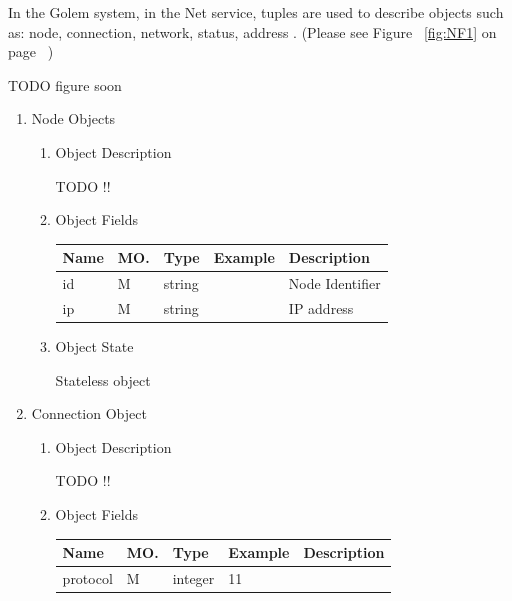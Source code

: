 In the Golem system, in the Net service, tuples are used to describe objects such as:
node, connection, network, status, address . (Please see Figure ~\ref{fig:NF1} on page ~\pageref{fig:NF1})

TODO figure soon

\begin{enumerate}

\item Node Objects

\begin{enumerate}

\item Object Description

TODO !!

\item Object Fields

\begin{center}
\begin{tabular}{|p{3cm}|l|p{3cm}|p{3cm}|p{4cm}|} 
\hline
\rowcolor{lightgray}	Name	& MO.	& Type	& Example & 	Description \\
\hline

id 	& M & string & 		& Node Identifier \\
\hline 		

ip & M & string  & 		& IP address \\
\hline

\end{tabular}
\end{center}

\item Object State

Stateless object

\end{enumerate}

\item Connection Object

\begin{enumerate}

\item Object Description

TODO !!

\item Object Fields

\begin{center}
\begin{tabular}{|p{3cm}|l|p{3cm}|p{3cm}|p{4cm}|} 
\hline
\rowcolor{lightgray}	Name	& MO.	& Type	& Example & 	Description \\
\hline

protocol 		& M & integer & 11		&  \\
\hline 		


\end{tabular}
\end{center}
\end{enumerate}
\end{enumerate}
